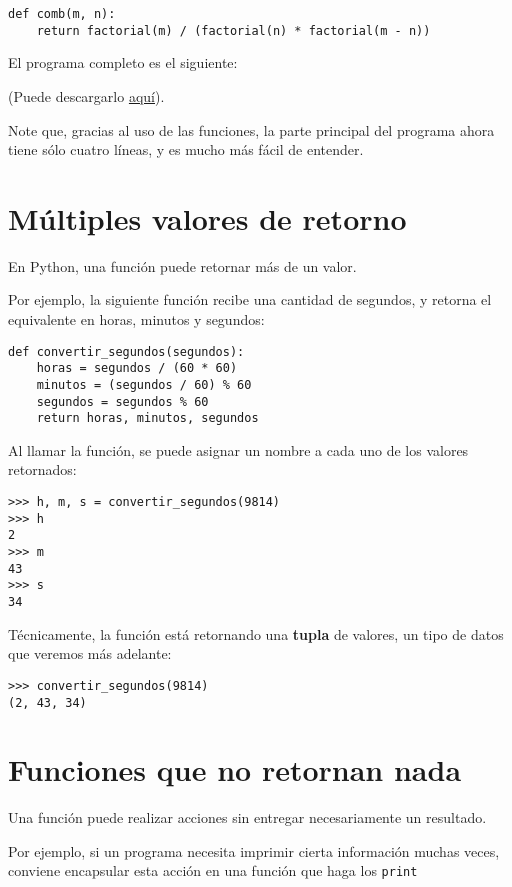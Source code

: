 \begin{lstlisting}
def comb(m, n):
    return factorial(m) / (factorial(n) * factorial(m - n))
\end{lstlisting}

El programa completo es el siguiente:

(Puede descargarlo \href{../\_static/programas/combinatorios.py}{aquí}).

Note que, gracias al uso de las funciones, la parte principal del
programa ahora tiene sólo cuatro líneas, y es mucho más fácil de
entender.

\section{Múltiples valores de retorno}

En Python, una función puede retornar más de un valor.

Por ejemplo, la siguiente función recibe una cantidad de segundos, y
retorna el equivalente en horas, minutos y segundos:

\begin{lstlisting}
def convertir_segundos(segundos):
    horas = segundos / (60 * 60)
    minutos = (segundos / 60) % 60
    segundos = segundos % 60
    return horas, minutos, segundos
\end{lstlisting}

Al llamar la función, se puede asignar un nombre a cada uno de los
valores retornados:

\begin{lstlisting}
>>> h, m, s = convertir_segundos(9814)
>>> h
2
>>> m
43
>>> s
34
\end{lstlisting}

Técnicamente, la función está retornando una \textbf{tupla} de valores,
un tipo de datos que veremos más adelante:

\begin{lstlisting}
>>> convertir_segundos(9814)
(2, 43, 34)
\end{lstlisting}

\section{Funciones que no retornan nada}

Una función puede realizar acciones sin entregar necesariamente un
resultado.

Por ejemplo, si un programa necesita imprimir cierta información muchas
veces, conviene encapsular esta acción en una función que haga los
\lstinline!print!


